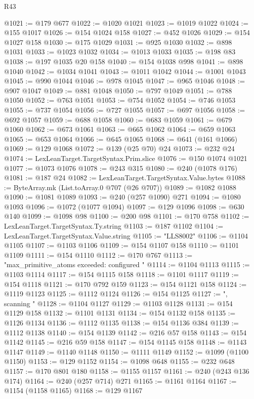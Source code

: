 \begin{lexlean}{R43}
\begin{coremodule}
@1021 := @179 @677
@1022 := @1020 @1021
@1023 := @1019 @1022
@1024 := @155 @1017
@1026 := @154 @1024 @158
@1027 := @452 @1026
@1029 := @154 @1027 @158
@1030 := @175 @1029
@1031 := @925 @1030
@1032 := @898 @1031
@1033 := @1023 @1032
@1034 := @1013 @1033
@1035 := @198 @83
@1038 := @197 @1035 @20 @158
@1040 := @154 @1038 @998
@1041 := @898 @1040
@1042 := @1034 @1041
@1043 := @1011 @1042
@1044 := @1001 @1043
@1045 := @990 @1044
@1046 := @978 @1045
@1047 := @965 @1046
@1048 := @907 @1047
@1049 := @881 @1048
@1050 := @797 @1049
@1051 := @788 @1050
@1052 := @763 @1051
@1053 := @754 @1052
@1054 := @746 @1053
@1055 := @737 @1054
@1056 := @727 @1055
@1057 := @697 @1056
@1058 := @692 @1057
@1059 := @688 @1058
@1060 := @683 @1059
@1061 := @679 @1060
@1062 := @673 @1061
@1063 := @665 @1062
@1064 := @659 @1063
@1065 := @653 @1064
@1066 := @645 @1065
@1068 := @641 (@161 @1066)
@1069 := @129 @1068
@1072 := @139 (@25 @70) @24
@1073 := @232 @24
@1074 := LexLeanTarget.TargetSyntax.Prim.slice
@1076 := @150 @1074 @1021
@1077 := @1073 @1076
@1078 := @243 @315
@1080 := @240 (@1078 @176)
@1081 := @187 @24
@1082 := LexLeanTarget.TargetSyntax.Value.bytes
@1088 := ByteArray.mk (List.toArray.{0} @707 (@26 @707))
@1089 := @1082 @1088
@1090 := @1081 @1089
@1093 := @240 (@257 @1090) @271
@1094 := @1080 @1093
@1096 := @1072 (@1077 @1094)
@1097 := @129 @1096
@1098 := @630 @140
@1099 := @1098 @98
@1100 := @200 @98
@1101 := @170 @758
@1102 := LexLeanTarget.TargetSyntax.Ty.string
@1103 := @187 @1102
@1104 := LexLeanTarget.TargetSyntax.Value.string
@1105 := "LLS8002"
@1106 := @1104 @1105
@1107 := @1103 @1106
@1109 := @154 @1107 @158
@1110 := @1101 @1109
@1111 := @154 @1110
@1112 := @170 @767
@1113 := "max_primitive_atoms exceeded: configured "
@1114 := @1104 @1113
@1115 := @1103 @1114
@1117 := @154 @1115 @158
@1118 := @1101 @1117
@1119 := @154 @1118
@1121 := @170 @792 @159
@1123 := @154 @1121 @158
@1124 := @1119 @1123
@1125 := @1112 @1124
@1126 := @154 @1125
@1127 := ", scanning "
@1128 := @1104 @1127
@1129 := @1103 @1128
@1131 := @154 @1129 @158
@1132 := @1101 @1131
@1134 := @154 @1132 @158
@1135 := @1126 @1134
@1136 := @1112 @1135
@1138 := @154 @1136 @384
@1139 := @1112 @1138
@1140 := @154 @1139
@1142 := @216 @57 @158
@1143 := @154 @1142
@1145 := @216 @59 @158
@1147 := @154 @1145 @158
@1148 := @1143 @1147
@1149 := @1140 @1148
@1150 := @1111 @1149
@1152 := @1099 (@1100 @1150)
@1153 := @129 @1152
@1154 := @1098 @648
@1155 := @232 @648
@1157 := @170 @801 @180
@1158 := @1155 @1157
@1161 := @240 (@243 @136 @174)
@1164 := @240 (@257 @714) @271
@1165 := @1161 @1164
@1167 := @1154 (@1158 @1165)
@1168 := @129 @1167

\end{coremodule}
\end{lexlean}
